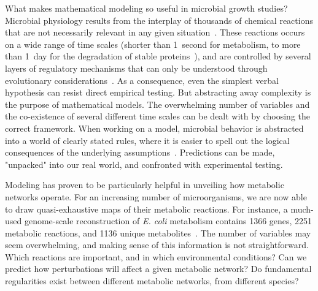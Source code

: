 What makes mathematical modeling so useful in microbial growth studies?
Microbial physiology results from the interplay of thousands of chemical reactions that are not necessarily relevant in any given situation~\cite{schaechter_microbe_2006}.
These reactions occurs on a wide range of time scales (shorter than 1~second for metabolism, to more than 1~day for the degradation of stable proteins~\cite{schaechter_microbe_2006}), and are controlled by several layers of regulatory mechanisms that can only be understood through evolutionary considerations~\cite{dawkins_selfish_1976}.
As a consequence, even the simplest verbal hypothesis can resist direct empirical testing.
But abstracting away complexity is the purpose of mathematical models.
The overwhelming number of variables and the co-existence of several different time scales can be dealt with by choosing the correct framework.
When working on a model, microbial behavior is abstracted into a world of clearly stated rules, where it is easier to spell out the logical consequences of the underlying assumptions~\cite{servedio_not_2014,mcgill_calm_2013}.
Predictions can be made, "unpacked" into our real world, and confronted with experimental testing.

Modeling has proven to be particularly helpful in unveiling how metabolic networks operate.
For an increasing number of microorganisms, we are now able to draw quasi-exhaustive maps of their metabolic reactions.
For instance, a much-used genome-scale reconstruction of \textit{E. coli} metabolism contains 1366 genes, 2251 metabolic reactions, and 1136 unique metabolites~\cite{orth_comprehensive_2011}.
The number of variables may seem overwhelming, and making sense of this information is not straightforward.
Which reactions are important, and in which environmental conditions?
Can we predict how perturbations will affect a given metabolic network?
Do fundamental regularities exist between different metabolic networks, from different species?

